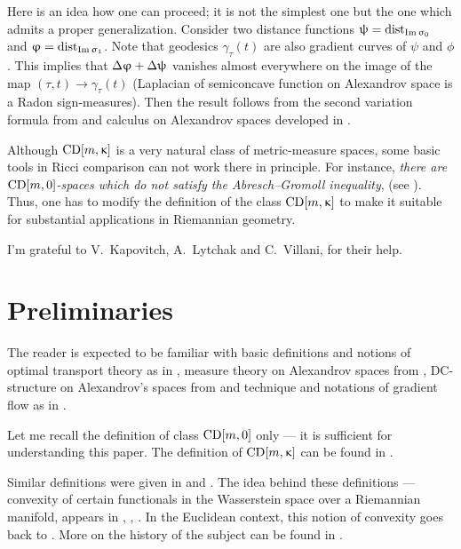 \documentclass[oneside,a4paper]{article}
\begin{document}
Here is an idea how one can proceed; 
it is not the simplest one but the one which admits a proper generalization.
Consider two distance functions $\uppsi=\mathop{\rm dist}\nolimits_{\mathop{\rm Im}\nolimits\upsigma_0}$ and $\upvarphi=\mathop{\rm dist}\nolimits_{\mathop{\rm Im}\nolimits\upsigma_1}$.
Note that geodesics $\gamma_\tau(t)$ are also gradient curves of $\psi$ and $\phi$.
This implies that $\Delta\upvarphi+\Delta\uppsi$ vanishes almost everywhere on the image of the map $(\tau,t)\to\gamma_\tau(t)$ (Laplacian of semiconcave function on Alexandrov space is a Radon sign-measures).
Then the result follows from the second variation formula from \cite{petrunin:parallel}
and calculus on Alexandrov spaces developed in \cite{perelman:DC}.



Although $\CD m \kappa$ is a very natural class of metric-measure spaces, 
some basic tools in Ricci comparison can not work there in principle.
For instance,
\emph{there are $\CD m 0$-spaces which do not satisfy the Abresch--Gromoll inequality}, (see \cite{AG}).
Thus, one has to modify the definition of the class $\CD m \kappa$
to make it suitable for substantial applications in Riemannian geometry.


\smallskip

I'm grateful to 
V.~Kapovitch,
A.~Lytchak 
and C.~Villani, 
for their help.

\section{Preliminaries}

The reader is expected to be familiar with 
basic definitions and notions of optimal transport  theory as in \cite{villani}, 
measure theory on Alexandrov spaces from \cite{BGP}, 
DC-structure on Alexandrov's spaces from \cite{perelman:DC} 
and technique and notations of gradient flow as in \cite{petrunin:survey}.


Let me recall the definition of class $\CD m0$ only --- it is sufficient for understanding this paper.
The definition of $\CD m\kappa$ can be found in \cite[29.8]{villani}.

Similar definitions were given in \cite{lott-villani} and \cite{sturm}.
The idea behind these definitions --- convexity of certain functionals in the Wasserstein space
over a Riemannian manifold, appears in \cite{otto-villani}, \cite{CMS}, \cite{SvR}.
In the Euclidean context, this notion of convexity goes back to \cite{McC}.
More on the history of the subject can be found in \cite{villani}.
\end{document}
